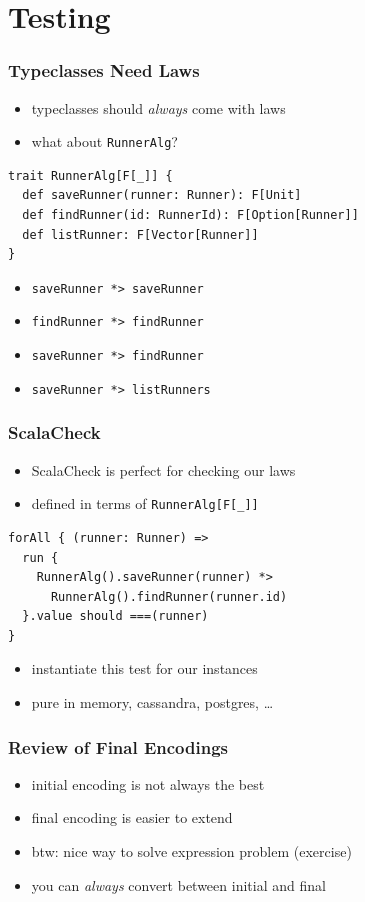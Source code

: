 \documentclass{beamer}
\begin{document}
\section{Testing}

\begin{frame}[fragile]
  \frametitle{Typeclasses Need Laws}
  \begin{itemize}
  \item<1-> typeclasses should \textit{always} come with laws
  \item<1-> what about \texttt{RunnerAlg}?
  \end{itemize}
\begin{verbatim}
trait RunnerAlg[F[_]] {
  def saveRunner(runner: Runner): F[Unit]
  def findRunner(id: RunnerId): F[Option[Runner]]
  def listRunner: F[Vector[Runner]]
}
\end{verbatim}
  \begin{itemize}
  \item<2-> \texttt{saveRunner *> saveRunner}
  \item<2-> \texttt{findRunner *> findRunner}
  \item<2-> \texttt{saveRunner *> findRunner}
  \item<2-> \texttt{saveRunner *> listRunners}
  \end{itemize}
\end{frame}

\begin{frame}[fragile]
  \frametitle{ScalaCheck}
  \begin{itemize}
  \item ScalaCheck is perfect for checking our laws
  \item defined in terms of \texttt{RunnerAlg[F[\_]]}
  \end{itemize}

\begin{verbatim}
forAll { (runner: Runner) =>
  run {
    RunnerAlg().saveRunner(runner) *>
      RunnerAlg().findRunner(runner.id)
  }.value should ===(runner)
}
\end{verbatim}
  \begin{itemize}
  \item instantiate this test for our instances
  \item pure in memory, cassandra, postgres, \dots{}
  \end{itemize}
\end{frame}

\begin{frame}
  \frametitle{Review of Final Encodings}
  \begin{itemize}
  \item initial encoding is not always the best
  \item final encoding is easier to extend
  \item btw: nice way to solve expression problem (exercise)
  \item you can \textit{always} convert between initial and final
  \end{itemize}
\end{frame}
\end{document}
